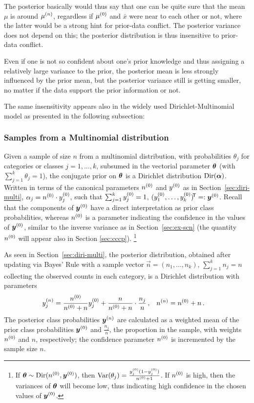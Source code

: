 The posterior basically would thus say that one can be quite sure that the mean $\mu$
is around $\mu^{(n)}$, regardless if $\mu^{(0)}$ and $\bar{x}$ were near to each other
or not, where the latter would be a strong hint for prior-data conflict.
The posterior variance does not depend on this; the posterior distribution is thus
insensitive to prior-data conflict.

Even if one is not so confident about one's prior knowledge and thus assigning a
relatively large variance to the prior, the posterior mean is less strongly influenced
by the prior mean, but the posterior variance still is getting smaller, no matter
if the data support the prior information or not.

The same insensitivity appears also in the widely used Dirichlet-Multinomial model
as presented in the following subsection:

\subsubsection{Samples from a Multinomial distribution} %
\label{sec:ex-mult}
Given a sample of size $n$ from a multinomial distribution, with
probabilities $\theta_j$ for categories or classes $j= 1,\ldots,k$, subsumed in
the vectorial parameter $\boldsymbol{\theta}$ (with $\sum_{j=1}^k \theta_j = 1$),
the conjugate prior on $\boldsymbol{\theta}$ is a Dirichlet distribution $\operatorname{Dir}(\boldsymbol{\alpha})$.
Written in terms of the canonical parameters $n^{(0)}$ and $y^{(0)}$ as in Section~\ref{sec:diri-multi},
$\alpha_j = n^{(0)} \cdot y^{(0)}_j$, such that $\sum_{j=1}^k y^{(0)}_j = 1$, $(y^{(0)}_1,\ldots,y^{(0)}_k)^{{\mbox{\!\scriptsize\textsf{T}}}} =: {\bm y}^{(0)}$.
Recall that the components of ${\bm y}^{(0)}$ have a direct
interpretation as prior class probabilities, whereas $n^{(0)}$ is a parameter
indicating the confidence in the values of ${\bm y}^{(0)}$, similar to the inverse
variance as in Section~\ref{sec:ex-scn}
(the quantity $n^{(0)}$ will appear also in Section \ref{sec:cccp}).%
\footnote{If $\boldsymbol{\theta} \sim \operatorname{Dir}(n^{(0)}, {\bm y}^{(0)})$, then
$\operatorname{Var}(\theta_j) = \frac{y^{(0)}_j (1-y^{(0)}_j)}{n^{(0)}+1}$. If $n^{(0)}$ is high,
then the variances of $\boldsymbol{\theta}$ will become low, thus indicating high
confidence in the chosen values of ${\bm y}^{(0)}$.}

As seen in Section~\ref{sec:diri-multi},
the posterior distribution, obtained after updating via Bayes' Rule with a sample vector $\vec{n} = (n_1,\ldots,n_k)$,
$\sum_{j=1}^k n_j = n$ collecting the observed counts in each category,
is a Dirichlet distribution with parameters
\begin{align*}
y^{(n)}_j &= \frac{n^{(0)}}{n^{(0)} + n} y^{(0)}_j + \frac{n}{n^{(0)} + n} \cdot \frac{n_j}{n}\,, &
n^{(n)}   &= n^{(0)} + n \,.
\end{align*}
The posterior class probabilities ${\bm y}^{(n)}$ are calculated as a weighted mean
of the prior class probabilities ${\bm y}^{(0)}$ and $\frac{n_j}{n}$, the proportion in the sample,
with weights $n^{(0)}$ and $n$, respectively; the confidence parameter $n^{(0)}$ is
incremented by the sample size $n$.

